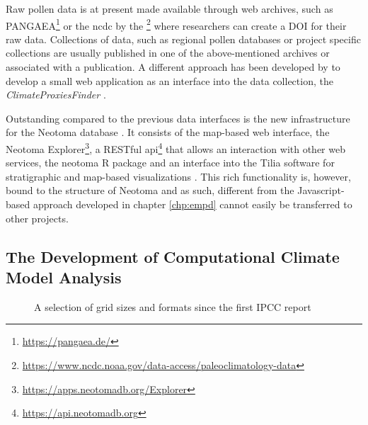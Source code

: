 \begin{refsection}
Raw pollen data is at present made available through web archives, such as PANGAEA\footnote{\url{https://pangaea.de/}} or the \gls{ncdc} by the \footnote{\url{https://www.ncdc.noaa.gov/data-access/paleoclimatology-data}} where researchers can create a DOI for their raw data. Collections of data, such as regional pollen databases or project specific collections \citep[e.g.][]{WhitmoreGajewskiSawadaEtAl2005, DavisZanonCollinsEtAl2013} are usually published in one of the above-mentioned archives or associated with a publication. A different approach has been developed by \cite{BollietBrockmannMassonDelmotteEtAl2016} to develop a small web application as an interface into the data collection, the \textit{ClimateProxiesFinder} \citep[chapter \ref{chp:empd}]{Brockmann2016}.

Outstanding compared to the previous data interfaces is the new infrastructure for the Neotoma database \citep{WilliamsGrimmBloisEtAl2018}. It consists of the map-based web interface, the Neotoma Explorer\footnote{\url{https://apps.neotomadb.org/Explorer}}, a RESTful api\footnote{\url{https://api.neotomadb.org}} that allows an interaction with other web services, the neotoma R package \citep{GoringDawsonSimpsonEtAl2015} and an interface into the Tilia software for stratigraphic and map-based visualizations \citep{WilliamsGrimmBloisEtAl2018}. This rich functionality is, however, bound to the structure of Neotoma and as such, different from the Javascript-based approach developed in chapter \ref{chp:empd} cannot easily be transferred to other projects.


\subsection{The Development of Computational Climate Model Analysis} \label{sec:intro-software-model}

\begin{figure}
	\caption{A selection of grid sizes and formats since the first IPCC report}
	\label{fig: grid-sizes}
\end{figure}


\end{refsection}

